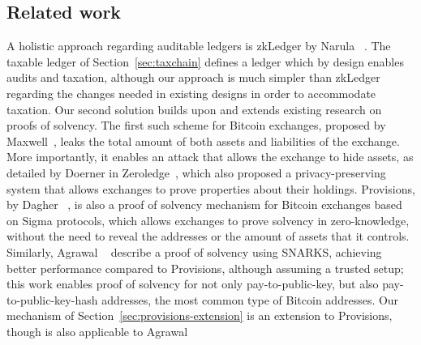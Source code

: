 \subsection{Related work}\label{sec:related}

A holistic approach regarding auditable ledgers is zkLedger by Narula
\etal~\cite{EPRINT:NarVasVir18}. The taxable ledger of
Section~\ref{sec:taxchain} defines a ledger which by design enables audits and
taxation, although our approach is much simpler than zkLedger regarding the
changes needed in existing designs in order to accommodate taxation. Our second
solution builds upon and extends existing research on proofs of solvency. The
first such scheme for Bitcoin exchanges, proposed by
Maxwell~\cite{wilcox2014proving}, leaks the total amount of both assets and
liabilities of the exchange. More importantly, it enables an attack that allows
the exchange to hide assets, as detailed by Doerner \etal in
Zeroledge~\cite{doernerzeroledge}, which also proposed a privacy-preserving
system that allows exchanges to prove properties about their holdings.
Provisions, by Dagher \etal~\cite{CCS:DBBCB15}, is also a proof of solvency
mechanism for Bitcoin exchanges based on Sigma protocols, which allows
exchanges to prove solvency in zero-knowledge, \ie without the need to reveal
the addresses or the amount of assets that it controls. Similarly, Agrawal
\etal~\cite{C:AgrGanMoh18} describe a proof of solvency using SNARKS, achieving
better performance compared to Provisions, although assuming a trusted setup;
this work enables proof of solvency for not only pay-to-public-key, but also
pay-to-public-key-hash addresses, the most common type of Bitcoin addresses.
Our mechanism of Section~\ref{sec:provisions-extension} is an extension to
Provisions, though is also applicable to Agrawal \etal
